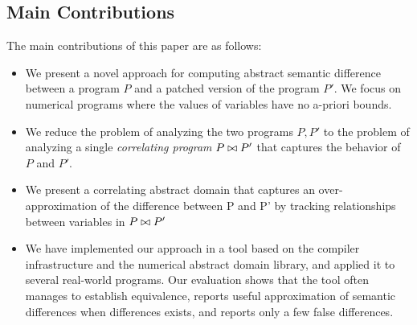 \subsection{Main Contributions}
The main contributions of this paper are as follows:
\begin{itemize}
\item We present a novel approach for computing abstract semantic difference between a program $P$ and a patched version of the program $P'$. We focus on numerical programs where the values of variables have no a-priori bounds.
\item We reduce the problem of analyzing the two programs $P,P'$ to the problem of analyzing a single \emph{correlating program} $P \bowtie P'$ that captures the behavior of $P$ and $P'$.
\item We present a correlating abstract domain that captures an over-approximation of the difference between P and P' by tracking relationships between variables in $P \bowtie P'$
\item We have implemented our approach in a tool based on the  compiler infrastructure and the  numerical abstract domain library, and applied it to several real-world programs. Our evaluation shows that the tool often manages to establish equivalence, reports useful approximation of semantic differences when differences exists, and reports only a few false differences.
\end{itemize}
